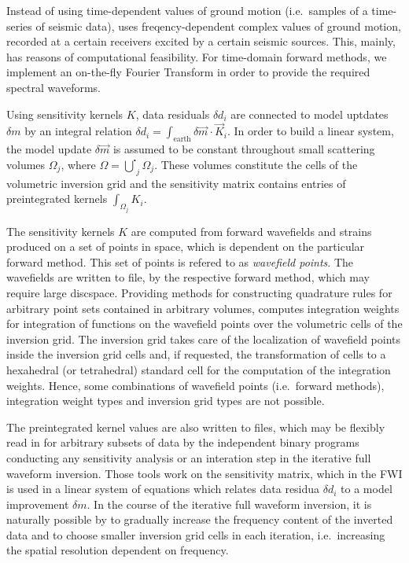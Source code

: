 Instead of using time-dependent values of ground motion (i.e.\ samples of a time-series of seismic data), 
\ASKI uses freqency-dependent complex values of ground motion, recorded at a certain receivers excited 
by a certain seismic sources. This, mainly, has reasons of computational feasibility.
For time-domain forward methods, we implement an on-the-fly Fourier Transform in order to provide the
required spectral waveforms. 

Using sensitivity kernels $K$, data residuals $\delta d_i$ are connected to model uptdates $\delta m$ by 
an integral relation $\delta d_i = \int_{\text{earth}} \delta \vec{m} \cdot \vec{K}_i$. In order to build a linear 
system, the model update $\delta \vec{m}$ is assumed to be constant throughout small scattering volumes 
$\Omega_j$, where $\Omega = \overset{\centerdot}{\bigcup}_j \Omega_j$. These volumes constitute the cells of the volumetric 
inversion grid and the sensitivity matrix contains entries of preintegrated kernels $\int_{\Omega_j} K_i$.

The sensitivity kernels $K$ are computed from forward wavefields and strains produced on a set of points in 
space, which
is dependent on the particular forward method. This set of points is refered to as \emph{wavefield points}. The 
wavefields are written to file, by the respective forward method, which may require large discspace. 
Providing methods for constructing quadrature rules for arbitrary point sets contained in 
arbitrary volumes, 
\ASKI computes integration weights for integration of functions on the wavefield points over the volumetric
cells of the inversion grid. The inversion grid takes care of the localization of wavefield points 
inside the inversion grid cells and, if requested, the transformation of cells to a hexahedral (or tetrahedral) 
standard 
cell for the computation of the integration weights. Hence, some combinations of wavefield points (i.e.\ 
forward methods), integration weight types and inversion grid types are not possible. 

The preintegrated kernel values are also written to files, which may be flexibly read in for arbitrary 
subsets of data
by the independent binary programs conducting any sensitivity analysis 
or an interation step in the iterative full waveform inversion.
Those tools work on the sensitivity matrix, which in the FWI is used in a linear system of equations which
relates data residua $\delta d_i$ to a model improvement $\delta m$. 
In the course of the iterative full waveform inversion, it is naturally possible by \ASKI to gradually increase
the frequency content of the inverted data and to choose smaller inversion grid cells in each iteration, i.e.\ increasing
the spatial resolution dependent on frequency.


